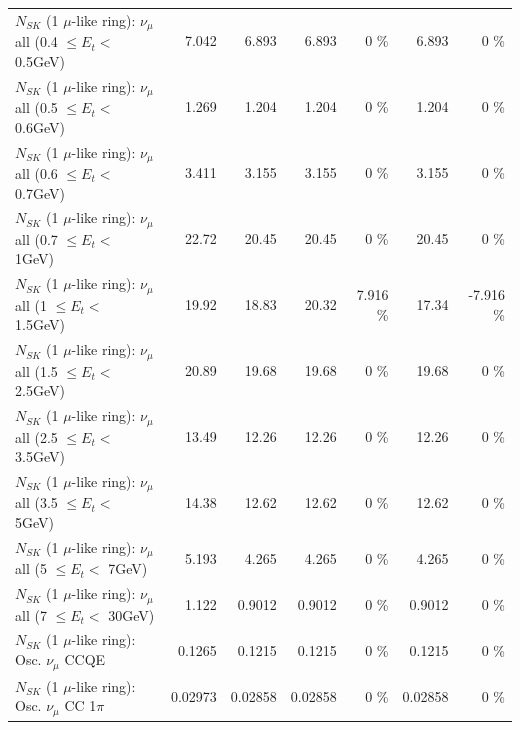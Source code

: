 \begin{table}
\begin{tabular}{| l | r | r | r  r | r  r |}
       $N_{SK}$ (1 $\mu$-like ring): $\nu_{\mu}$ all (0.4 $\leq E_{t} <$ 0.5GeV) &           7.042 &           6.893 &           6.893 &        0 \%  &           6.893 &        0 \%  \\ 
       $N_{SK}$ (1 $\mu$-like ring): $\nu_{\mu}$ all (0.5 $\leq E_{t} <$ 0.6GeV) &           1.269 &           1.204 &           1.204 &        0 \%  &           1.204 &        0 \%  \\ 
       $N_{SK}$ (1 $\mu$-like ring): $\nu_{\mu}$ all (0.6 $\leq E_{t} <$ 0.7GeV) &           3.411 &           3.155 &           3.155 &        0 \%  &           3.155 &        0 \%  \\ 
         $N_{SK}$ (1 $\mu$-like ring): $\nu_{\mu}$ all (0.7 $\leq E_{t} <$ 1GeV) &           22.72 &           20.45 &           20.45 &        0 \%  &           20.45 &        0 \%  \\ 
         $N_{SK}$ (1 $\mu$-like ring): $\nu_{\mu}$ all (1 $\leq E_{t} <$ 1.5GeV) &           19.92 &           18.83 &           20.32 &    7.916 \%  &           17.34 &   -7.916 \%  \\ 
       $N_{SK}$ (1 $\mu$-like ring): $\nu_{\mu}$ all (1.5 $\leq E_{t} <$ 2.5GeV) &           20.89 &           19.68 &           19.68 &        0 \%  &           19.68 &        0 \%  \\ 
       $N_{SK}$ (1 $\mu$-like ring): $\nu_{\mu}$ all (2.5 $\leq E_{t} <$ 3.5GeV) &           13.49 &           12.26 &           12.26 &        0 \%  &           12.26 &        0 \%  \\ 
         $N_{SK}$ (1 $\mu$-like ring): $\nu_{\mu}$ all (3.5 $\leq E_{t} <$ 5GeV) &           14.38 &           12.62 &           12.62 &        0 \%  &           12.62 &        0 \%  \\ 
           $N_{SK}$ (1 $\mu$-like ring): $\nu_{\mu}$ all (5 $\leq E_{t} <$ 7GeV) &           5.193 &           4.265 &           4.265 &        0 \%  &           4.265 &        0 \%  \\ 
          $N_{SK}$ (1 $\mu$-like ring): $\nu_{\mu}$ all (7 $\leq E_{t} <$ 30GeV) &           1.122 &          0.9012 &          0.9012 &        0 \%  &          0.9012 &        0 \%  \\ 
\hline
\hline
                               $N_{SK}$ (1 $\mu$-like ring): Osc. $\nu_\mu$ CCQE &          0.1265 &          0.1215 &          0.1215 &        0 \%  &          0.1215 &        0 \%  \\ 
                          $N_{SK}$ (1 $\mu$-like ring): Osc. $\nu_\mu$ CC 1$\pi$ &         0.02973 &         0.02858 &         0.02858 &        0 \%  &         0.02858 &        0 \%  \\ 

\end{tabular}
\end{table}
